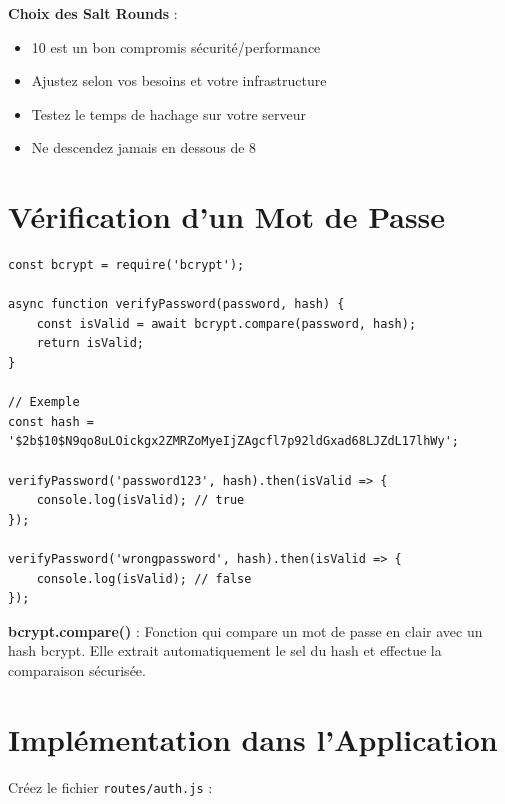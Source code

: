 \begin{bestpracticebox}
    \textbf{Choix des Salt Rounds} :
    \begin{itemize}
        \item 10 est un bon compromis sécurité/performance
        \item Ajustez selon vos besoins et votre infrastructure
        \item Testez le temps de hachage sur votre serveur
        \item Ne descendez jamais en dessous de 8
    \end{itemize}
\end{bestpracticebox}

\section{Vérification d'un Mot de Passe}

\begin{lstlisting}[style=javascript, caption=Vérification d'un mot de passe avec bcrypt]
const bcrypt = require('bcrypt');

async function verifyPassword(password, hash) {
    const isValid = await bcrypt.compare(password, hash);
    return isValid;
}

// Exemple
const hash = '$2b$10$N9qo8uLOickgx2ZMRZoMyeIjZAgcfl7p92ldGxad68LJZdL17lhWy';

verifyPassword('password123', hash).then(isValid => {
    console.log(isValid); // true
});

verifyPassword('wrongpassword', hash).then(isValid => {
    console.log(isValid); // false
});
\end{lstlisting}

\begin{definitionbox}
    \textbf{bcrypt.compare()} : Fonction qui compare un mot de passe en clair avec un hash bcrypt. Elle extrait automatiquement le sel du hash et effectue la comparaison sécurisée.
\end{definitionbox}

\section{Implémentation dans l'Application}

Créez le fichier \texttt{routes/auth.js} :

